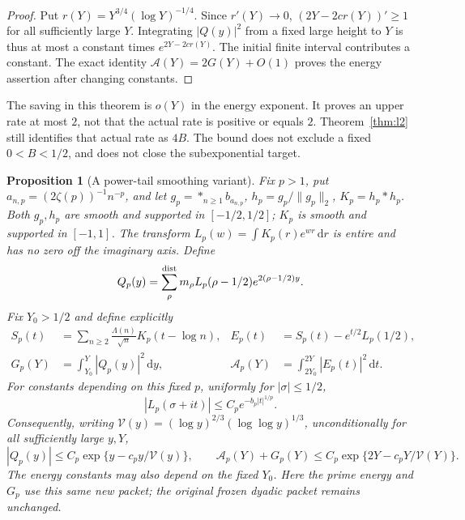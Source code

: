 \documentclass[11pt]{article}
\newtheorem{proposition}[theorem]{Proposition}
\theoremstyle{remark}\newtheorem{remark}[theorem]{Remark}
\newcommand{\dd}{\,\mathrm d}
\begin{document}
\begin{proof}
Put $r(Y)=Y^{3/4}(\log Y)^{-1/4}$. Since $r'(Y)\to0$,
$(2Y-2cr(Y))'\ge1$ for all sufficiently large $Y$.
Integrating $|Q(y)|^2$ from a fixed large height to $Y$
is thus at most a constant times $e^{2Y-2cr(Y)}$.
The initial finite interval contributes a constant.
The exact identity $\mathcal A(Y)=2G(Y)+O(1)$ proves the energy
assertion after changing constants.
\end{proof}

The saving in this theorem is $o(Y)$ in the energy exponent.
It proves an upper rate at most $2$, not that the actual rate
is positive or equals $2$. Theorem~\ref{thm:l2} still identifies
that actual rate as $4B$. The bound does not exclude a fixed
$0<B<1/2$, and does not close the subexponential target.

\begin{proposition}[A power-tail smoothing variant]\label{prop:power-packet}
Fix $p>1$, put $a_{n,p}=(2\zeta(p))^{-1}n^{-p}$, and let
$g_p=*_{n\ge1}b_{a_{n,p}}$, $h_p=g_p/\|g_p\|_2$,
$K_p=h_p*h_p$. Both $g_p,h_p$ are smooth and supported in
$[-1/2,1/2]$; $K_p$ is smooth and supported in $[-1,1]$. The transform
$L_p(w)=\int K_p(r)e^{wr}\dd r$ is entire and has no zero
off the imaginary axis. Define
\[
 Q_p(y)=\sum_\rho^{\rm dist}m_\rho L_p(\rho-1/2)
                                      e^{2(\rho-1/2)y}.
\]
Fix $Y_0>1/2$ and define explicitly
\begin{align*}
 S_p(t)&=\sum_{n\ge2}\frac{\Lambda(n)}{\sqrt n}K_p(t-\log n),
 &E_p(t)&=S_p(t)-e^{t/2}L_p(1/2),\\
 G_p(Y)&=\int_{Y_0}^Y|Q_p(y)|^2\dd y,
 &\mathcal A_p(Y)&=\int_{2Y_0}^{2Y}|E_p(t)|^2\dd t.
\end{align*}
For constants depending on this fixed $p$, uniformly for
$|\sigma|\le1/2$,
\[
 |L_p(\sigma+it)|\le C_p e^{-b_p|t|^{1/p}}.
\]
Consequently, writing
$\mathcal V(y)=(\log y)^{2/3}(\log\log y)^{1/3}$,
unconditionally for all sufficiently large $y,Y$,
\[
 |Q_p(y)|\le C_p\exp\{y-c_p y/\mathcal V(y)\},\qquad
 \mathcal A_p(Y)+G_p(Y)
   \le C_p\exp\{2Y-c_pY/\mathcal V(Y)\}.
\]
The energy constants may also depend on the fixed $Y_0$.
Here the prime energy and $G_p$ use this same new packet;
the original frozen dyadic packet remains unchanged.
\end{proposition}
\end{document}
